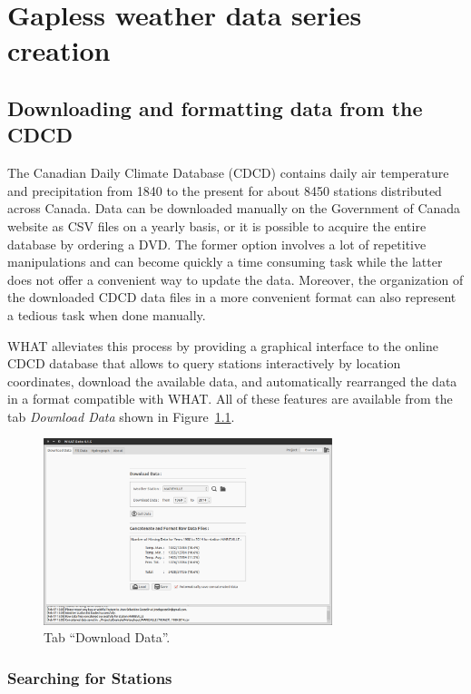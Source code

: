 \documentclass[WHATMANUAL.tex]{subfiles}
\begin{document}
\chapter{Gapless weather data series creation}\label{chap:gapfilling}

\section{Downloading and formatting data from the CDCD}

The Canadian Daily Climate Database (CDCD) contains daily air temperature and precipitation from 1840 to the present for about 8450 stations distributed across Canada. Data can be downloaded manually on the Government of Canada website as CSV files on a yearly basis, or it is possible to acquire the entire database by ordering a DVD. The former option involves a lot of repetitive manipulations and can become quickly a time consuming task while the latter does not offer a convenient way to update the data. Moreover, the organization of the downloaded CDCD data files in a more convenient format can also represent a tedious task when done manually.

WHAT alleviates this process by providing a graphical interface to the online CDCD database that allows to query stations interactively by location coordinates, download the available data, and automatically rearranged the data in a format compatible with WHAT. All of these features are available from the tab \emph{Download Data} shown in Figure~\ref{fig:tab_dwnldData}.

\begin{figure}[!ht]
\centering
\includegraphics[width=0.75\textwidth]{img/WHAT_Screenshot000}
\caption[Tab ``Download Data''.]{Tab ``Download Data''.}
\label{fig:tab_dwnldData}
\end{figure}

\subsection{Searching for Stations}
\end{document}
